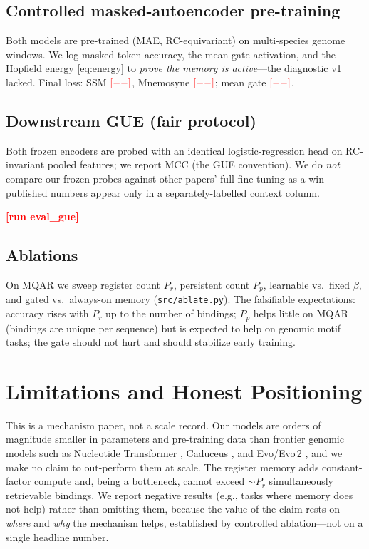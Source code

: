\documentclass[10pt,journal]{IEEEtran}
\newcommand{\gueTable}{\textbf{\textcolor{red}{[run eval\_gue]}}}
\newcommand{\ssmLoss}{\textcolor{red}{[--]}}
\newcommand{\mnemLoss}{\textcolor{red}{[--]}}
\newcommand{\mnemGate}{\textcolor{red}{[--]}}}
\begin{document}
\subsection{Controlled masked-autoencoder pre-training}
Both models are pre-trained (MAE, RC-equivariant) on multi-species genome
windows. We log masked-token accuracy, the mean gate activation, and the Hopfield
energy \eqref{eq:energy} to \emph{prove the memory is active}---the diagnostic v1
lacked. Final loss: SSM $\ssmLoss$, Mnemosyne $\mnemLoss$; mean gate $\mnemGate$.

\subsection{Downstream GUE (fair protocol)}
Both frozen encoders are probed with an identical logistic-regression head on
RC-invariant pooled features; we report MCC (the GUE convention). We do
\emph{not} compare our frozen probes against other papers' full fine-tuning as a
win---published numbers appear only in a separately-labelled context column.
\begin{table}[H]\centering\caption{GUE, frozen linear probe, both models.}\gueTable{}\end{table}

\subsection{Ablations}
On MQAR we sweep register count $P_r$, persistent count $P_p$, learnable vs.\
fixed $\beta$, and gated vs.\ always-on memory (\texttt{src/ablate.py}). The
falsifiable expectations: accuracy rises with $P_r$ up to the number of bindings;
$P_p$ helps little on MQAR (bindings are unique per sequence) but is expected to
help on genomic motif tasks; the gate should not hurt and should stabilize early
training.

\section{Limitations and Honest Positioning}
This is a mechanism paper, not a scale record. Our models are orders of magnitude
smaller in parameters and pre-training data than frontier genomic models such as
Nucleotide Transformer \cite{dalla2023nt}, Caduceus \cite{schiff2024caduceus}, and
Evo/Evo\,2 \cite{nguyen2024evo}, and we make no claim to out-perform them at
scale. The register memory adds constant-factor compute and, being a bottleneck,
cannot exceed $\sim P_r$ simultaneously retrievable bindings. We report negative
results (e.g., tasks where memory does not help) rather than omitting them,
because the value of the claim rests on \emph{where} and \emph{why} the mechanism
helps, established by controlled ablation---not on a single headline number.
\end{document}
